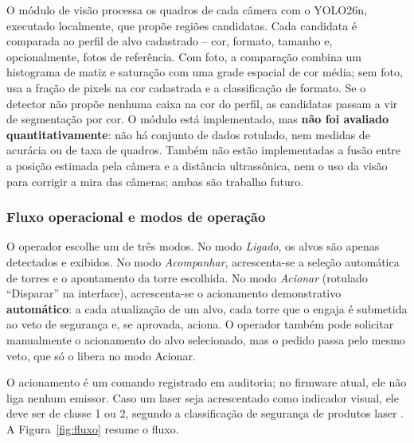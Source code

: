 \documentclass[12pt,a4paper]{article}
\begin{document}
O módulo de visão processa os quadros de cada câmera com o YOLO26n, executado localmente, que
propõe regiões candidatas. Cada candidata é comparada ao perfil de alvo cadastrado -- cor, formato,
tamanho e, opcionalmente, fotos de referência. Com foto, a comparação combina um histograma de matiz
e saturação com uma grade espacial de cor média; sem foto, usa a fração de pixels na cor cadastrada
e a classificação de formato. Se o detector não propõe nenhuma caixa na cor do perfil, as candidatas
passam a vir de segmentação por cor. O módulo está implementado, mas \textbf{não foi avaliado
quantitativamente}: não há conjunto de dados rotulado, nem medidas de acurácia ou de taxa de
quadros. Também não estão implementadas a fusão entre a posição estimada pela câmera e a distância
ultrassônica, nem o uso da visão para corrigir a mira das câmeras; ambas são trabalho futuro.

\subsubsection{Fluxo operacional e modos de operação}

O operador escolhe um de três modos. No modo \textit{Ligado}, os alvos são apenas detectados e
exibidos. No modo \textit{Acompanhar}, acrescenta-se a seleção automática de torres e o apontamento
da torre escolhida. No modo \textit{Acionar} (rotulado ``Disparar'' na interface), acrescenta-se o
acionamento demonstrativo \textbf{automático}: a cada atualização de um alvo, cada torre que o
engaja é submetida ao veto de segurança e, se aprovada, aciona. O operador também pode solicitar
manualmente o acionamento do alvo selecionado, mas o pedido passa pelo mesmo veto, que só o libera
no modo Acionar.

O acionamento é um comando registrado em auditoria; no firmware atual, ele não liga nenhum emissor.
Caso um laser seja acrescentado como indicador visual, ele deve ser de classe 1 ou 2, segundo a
classificação de segurança de produtos laser \cite{iec60825}. A Figura~\ref{fig:fluxo} resume o
fluxo.
\end{document}
